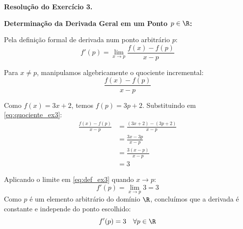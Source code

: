 \begin{center}
\end{center}

\vspace{0.6cm}
\noindent\textbf{Resolução do Exercício 3.}
\label{res:7.2.3}
\setcounter{equation}{0}

\textbf{Determinação da Derivada Geral em um Ponto $p \in \R$:}

Pela definição formal de derivada num ponto arbitrário $p$:
\begin{equation}
    f'(p) = \lim_{x \to p} \frac{f(x) - f(p)}{x - p} \label{eq:def_ex3}
\end{equation}

Para $x \neq p$, manipulamos algebricamente o quociente incremental:
\begin{equation}
    \frac{f(x) - f(p)}{x - p} \label{eq:quociente_ex3}
\end{equation}

Como $f(x) = 3x + 2$, temos $f(p) = 3p + 2$. Substituindo em \eqref{eq:quociente_ex3}:
\begin{align*}
    \frac{f(x) - f(p)}{x - p} &= \frac{(3x + 2) - (3p + 2)}{x - p} \\[0.25cm]
    &= \frac{3x - 3p}{x - p} \\[0.25cm]
    &= \frac{3(x - p)}{x - p} \\[0.25cm]
    &= 3
\end{align*}

Aplicando o limite em \eqref{eq:def_ex3} quando $x \to p$:
\[
f'(p) = \lim_{x \to p} 3 = 3
\]
Como $p$ é um elemento arbitrário do domínio $\R$, concluímos que a derivada é constante e independe do ponto escolhido:
\begin{equation}
    f'(p) = 3 \quad \forall p \in \R \label{eq:resultado_geral_ex3}
\end{equation}

